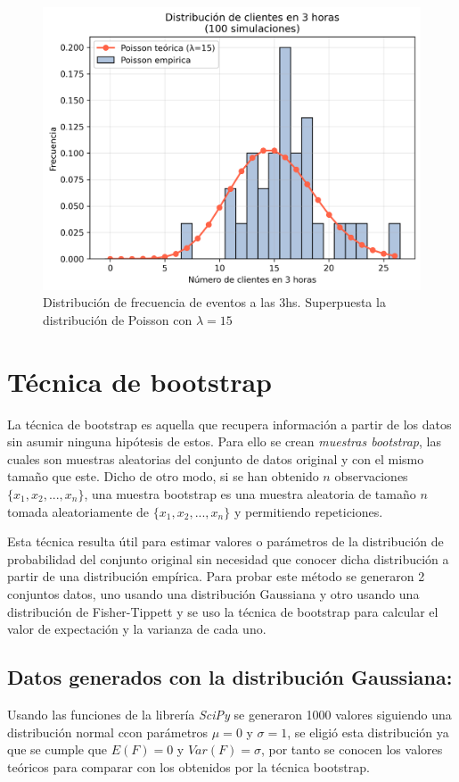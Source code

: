 \documentclass[baaa]{baaa}
\begin{document}
\begin{figure}[h]
    \centering
    \includegraphics[width=\linewidth]{imagenes/poisson_completo.png}
    \caption{Distribución de frecuencia de eventos a las 3hs. Superpuesta la distribución de Poisson con $\lambda=15$ }
    \label{fig:poisson3h}
\end{figure}



\section{Técnica de bootstrap}
La técnica de bootstrap es aquella que recupera información a partir de los datos sin asumir ninguna hipótesis de estos. Para ello se crean \textit{muestras bootstrap}, las cuales son muestras aleatorias del conjunto de datos original y con el mismo tamaño que este. Dicho de otro modo, si se han obtenido $n$ observaciones $\{x_1,x_2,...,x_n\}$, una muestra bootstrap es una muestra aleatoria de tamaño $n$ tomada aleatoriamente de $\{x_1,x_2,...,x_n\}$ y permitiendo repeticiones.  

Esta técnica resulta útil para estimar valores o parámetros de la distribución de probabilidad del conjunto original sin necesidad que conocer dicha distribución a partir de una distribución empírica. 
Para probar este método se generaron 2 conjuntos datos, uno usando una distribución Gaussiana y otro usando una distribución de Fisher-Tippett y se uso la técnica de bootstrap para calcular el valor de expectación y la varianza de cada uno. 

\subsection{Datos generados con la distribución Gaussiana:} 
Usando las funciones de la librería \textit{SciPy}  se generaron 1000 valores siguiendo una distribución normal ccon parámetros $\mu=0$ y $\sigma=1$, se eligió esta distribución ya que se cumple que $E(F)=0$ y $Var(F)=\sigma$, por tanto se conocen los valores teóricos para comparar con los obtenidos por la técnica bootstrap.
\end{document}

